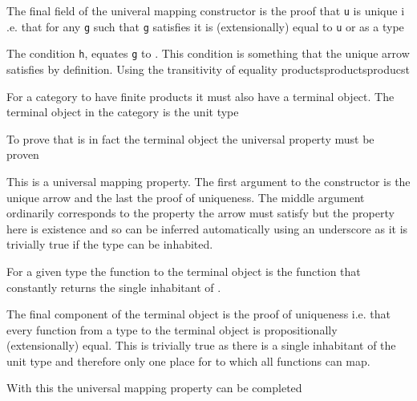 
The final field of the univeral mapping constructor is the proof that \verb|u|
is unique i .e. that for any \verb|g| such that \verb|g| satisfies
 it is (extensionally) equal to \verb|u| or as a
type


The condition \verb|h|, equates \verb|g| to . This condition is
something that the unique arrow satisfies by definition. Using the transitivity
of equality 
productsproductsproducst

For a category to have finite products it must also have a terminal object. The
terminal object in the category  is the unit type


To prove that  is in fact the terminal object the universal property
must be proven


This is a universal mapping property. The first argument to the constructor is
the unique arrow and the last the proof of uniqueness. The middle argument
ordinarily corresponds to the property the arrow must satisfy but the property
here is existence and so can be inferred automatically using an underscore as it
is trivially true if the type can be inhabited.

For a given type the function to the terminal object is the function that
constantly returns the single inhabitant of .


The final component of the terminal object is the proof of uniqueness i.e. that
every function from a type to the terminal object is propositionally
(extensionally) equal. This
is trivially true as there is a single inhabitant of the unit type and therefore
only one place for to which all functions can map.


With this the universal mapping property can be completed



